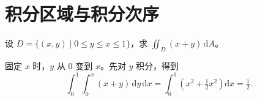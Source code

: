 \documentclass[a4paper,11pt]{article}
\begin{document}
\section*{积分区域与积分次序}
设 $D=\{(x,y)\mid 0\le y\le x\le 1\}$，求
\(\displaystyle\iint_D (x+y)\,\mathrm{d}A\)。

固定 $x$ 时，$y$ 从 $0$ 变到 $x$。先对 $y$ 积分，得到
\[
  \int_0^1\!\int_0^x (x+y)\,\mathrm{d}y\,\mathrm{d}x
  = \int_0^1 \left(x^2+\tfrac12 x^2\right)\mathrm{d}x
  = \tfrac12 .
\]
\end{document}
